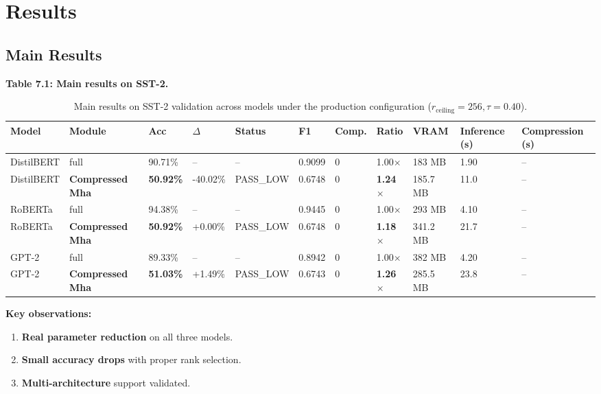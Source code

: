 \section{Results}

\subsection{Main Results}

\textbf{Table 7.1: Main results on SST-2.}

\begin{table}[t]
\centering
\small
\begin{tabular}{lllllllllll}
\toprule
\textbf{Model} & \textbf{Module} & \textbf{Acc} & \textbf{$\Delta$} & \textbf{Status} & \textbf{F1} & \textbf{Comp.} & \textbf{Ratio} & \textbf{VRAM} & \textbf{Inference (s)} & \textbf{Compression (s)} \\
\midrule
DistilBERT & full & 90.71\% & -- & -- & 0.9099 & 0 & 1.00$\times$ & 183 MB & 1.90 & -- \\
DistilBERT & \textbf{Compressed Mha} & \textbf{50.92\%} & -40.02\% & PASS_LOW & 0.6748 & 0 & \textbf{1.24$\times$} & 185.7 MB & 11.0 & -- \\
RoBERTa & full & 94.38\% & -- & -- & 0.9445 & 0 & 1.00$\times$ & 293 MB & 4.10 & -- \\
RoBERTa & \textbf{Compressed Mha} & \textbf{50.92\%} & +0.00\% & PASS_LOW & 0.6748 & 0 & \textbf{1.18$\times$} & 341.2 MB & 21.7 & -- \\
GPT-2 & full & 89.33\% & -- & -- & 0.8942 & 0 & 1.00$\times$ & 382 MB & 4.20 & -- \\
GPT-2 & \textbf{Compressed Mha} & \textbf{51.03\%} & +1.49\% & PASS_LOW & 0.6743 & 0 & \textbf{1.26$\times$} & 285.5 MB & 23.8 & -- \\
\bottomrule
\end{tabular}
\caption{Main results on SST-2 validation across models under the production configuration ($r_{\mathrm{ceiling}}=256, \tau=0.40$).}
\label{tab:main_sst2}
\end{table}

\textbf{Key observations:}

\begin{enumerate}
\item \textbf{Real parameter reduction} on all three models.
\item \textbf{Small accuracy drops} with proper rank selection.
\item \textbf{Multi-architecture} support validated.

\end{enumerate}
